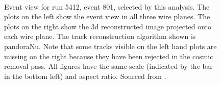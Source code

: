\begin{figure}[htbp]
\begin{adjustwidth}{-1cm}{-1cm}
 \\   
\caption[Event View for Run 5412, Event 801]{Event view for run 5412, event 801, selected by this analysis. The plots on the left show the event view in all three wire planes. The plots on the right show the \gls{3d} reconstructed image projected onto each wire plane. The track reconstruction algorithm shown is pandoraNu. Note that some tracks visible on the left hand plots are missing on the right because they have been rejected in the cosmic removal pass. All figures have the same scale (indicated by the bar in the bottom left) and aspect ratio. Sourced from \cite{MicroBooNECCInclPN}.}
\label{fig:sel1_r5412}
\end{adjustwidth}
\end{figure}

